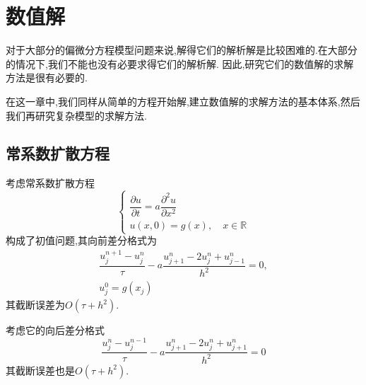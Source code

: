 \chapter{数值解}
对于大部分的偏微分方程模型问题来说,解得它们的解析解是比较困难的.在大部分的情况下,我们不能也没有必要求得它们的解析解.
因此,研究它们的数值解的求解方法是很有必要的.\par
在这一章中,我们同样从简单的方程开始解,建立数值解的求解方法的基本体系,然后我们再研究复杂模型的求解方法.
\section{常系数扩散方程}
考虑常系数扩散方程
\begin{equation}\label{eq:04_cxsks_o}
\begin{cases}
 \dfrac{\partial u}{\partial t}=a\dfrac{\partial^2 u}{\partial x^2} \\
 u(x,0)=g(x),\quad x\in\mathbb{R}
\end{cases}
\end{equation}
构成了初值问题,其向前差分格式为
\begin{gather}
 \dfrac{u_{j}^{n+1}-u_j^n}{\tau}-a\dfrac{u_{j+1}^n-2u_j^n+u_{j-1}^n}{h^2}=0,\label{eq:04_cxsks_xq}\\
 u_j^0 = g(x_j)
\end{gather}
其截断误差为$O(\tau+h^2)$.\par
考虑它的向后差分格式
\begin{equation}\label{eq:04_cxsks_xh}
 \dfrac{u_j^n-u_j^{n-1}}{\tau}-a\dfrac{u_{j+1}^n-2u_j^n+u_{j+1}^n}{h^2}=0
\end{equation}
其截断误差也是$O(\tau+h^2)$.
